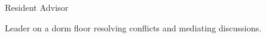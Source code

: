 {
  {Resident Advisor} \\
}
{\item{Leader on a dorm floor resolving conflicts and mediating discussions.}}


